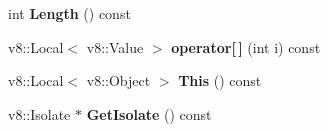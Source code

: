 \begin{DoxyCompactItemize}
int {\bfseries Length} () const
\item 
\mbox{\label{class_nan_1_1_function_callback_info_ac45d921b03b31672dc08f92ec82f03a7}} 
v8\+::\+Local$<$ v8\+::\+Value $>$ {\bfseries operator\mbox{[}$\,$\mbox{]}} (int i) const
\item 
\mbox{\label{class_nan_1_1_function_callback_info_a8717479540584144575226dfae00c31a}} 
v8\+::\+Local$<$ v8\+::\+Object $>$ {\bfseries This} () const
\item 
\mbox{\label{class_nan_1_1_function_callback_info_af71e664e7d052752df01683d56b5edc2}} 
v8\+::\+Isolate $\ast$ {\bfseries Get\+Isolate} () const
\end{DoxyCompactItemize}
